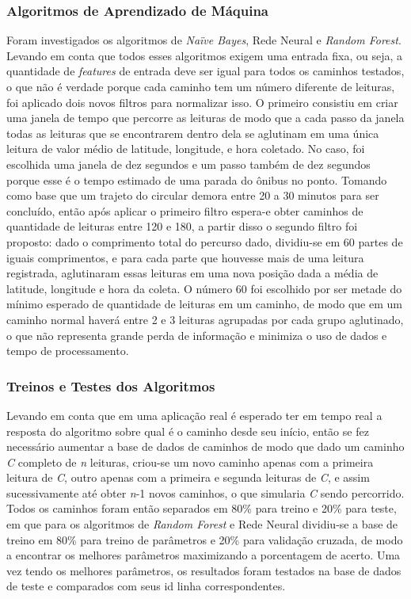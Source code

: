 \documentclass[11pt,twoside]{article}
\begin{document}
\subsubsection{Algoritmos de Aprendizado de Máquina}

Foram investigados os algoritmos de \emph{Naïve Bayes}, Rede Neural e \emph{Random Forest}. Levando em conta que todos esses algoritmos exigem uma entrada fixa, ou seja, a quantidade de \emph{features} de entrada deve ser igual para todos os caminhos testados, o que não é verdade porque cada caminho tem um número diferente de leituras, foi aplicado dois novos filtros para normalizar isso. O primeiro consistiu em criar uma janela de tempo que percorre as leituras de modo que a cada passo da janela todas as leituras que se encontrarem dentro dela se aglutinam em uma única leitura de valor médio de latitude, longitude, e hora coletado. No caso, foi escolhida uma janela de dez segundos e um passo também de dez segundos porque esse é o tempo estimado de uma parada do ônibus no ponto. Tomando como base que um trajeto do circular demora entre 20 a 30 minutos para ser concluído, então após aplicar o primeiro filtro espera-e obter caminhos de quantidade de leituras entre 120 e 180, a partir disso o segundo filtro foi proposto: dado o comprimento total do percurso dado, dividiu-se em 60 partes de iguais comprimentos, e para cada parte que houvesse mais de uma leitura registrada, aglutinaram essas leituras em uma nova posição dada a média de latitude, longitude e hora da coleta. O número 60 foi escolhido por ser metade do mínimo esperado de quantidade de leituras em um caminho, de modo que em um caminho normal haverá entre 2 e 3 leituras agrupadas por cada grupo aglutinado, o que não representa grande perda de informação e minimiza o uso de dados e tempo de processamento.

\subsubsection{Treinos e Testes dos Algoritmos}

Levando em conta que em uma aplicação real é esperado ter em tempo real a resposta do algoritmo sobre qual é o caminho desde seu início, então se fez necessário aumentar a base de dados de caminhos de modo que dado um caminho \emph{C} completo de \emph{n} leituras, criou-se um novo caminho apenas com a primeira leitura de \emph{C}, outro apenas com a primeira e segunda leituras de \emph{C}, e assim sucessivamente até obter \emph{n}-1 novos caminhos, o que simularia \emph{C} sendo percorrido. Todos os caminhos foram então separados em 80\% para treino e 20\% para teste, em que para os algoritmos de \emph{Random Forest} e Rede Neural dividiu-se a base de treino em 80\% para treino de parâmetros e 20\% para validação cruzada, de modo a encontrar os melhores parâmetros maximizando a porcentagem de acerto. Uma vez tendo os melhores parâmetros, os resultados foram testados na base de dados de teste e comparados com seus id linha correspondentes.
\end{document}
